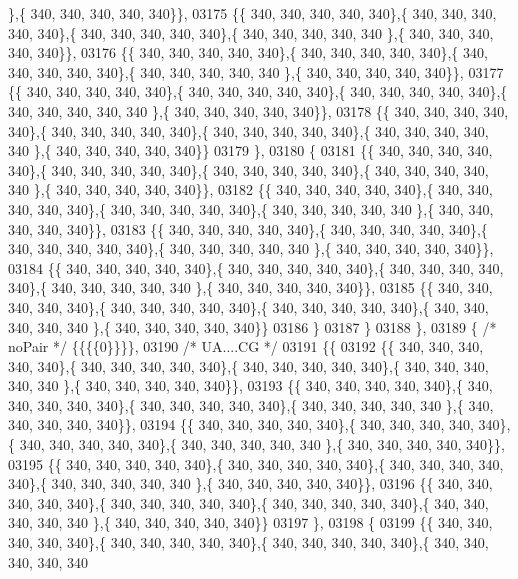 \begin{DoxyCode}
      \},\{ 340, 340, 340, 340, 340\}\},
03175 \{\{ 340, 340, 340, 340, 340\},\{ 340, 340, 340, 340, 340\},\{ 340, 340, 340, 340, 340\},\{ 340, 340, 340, 340, 340
      \},\{ 340, 340, 340, 340, 340\}\},
03176 \{\{ 340, 340, 340, 340, 340\},\{ 340, 340, 340, 340, 340\},\{ 340, 340, 340, 340, 340\},\{ 340, 340, 340, 340, 340
      \},\{ 340, 340, 340, 340, 340\}\},
03177 \{\{ 340, 340, 340, 340, 340\},\{ 340, 340, 340, 340, 340\},\{ 340, 340, 340, 340, 340\},\{ 340, 340, 340, 340, 340
      \},\{ 340, 340, 340, 340, 340\}\},
03178 \{\{ 340, 340, 340, 340, 340\},\{ 340, 340, 340, 340, 340\},\{ 340, 340, 340, 340, 340\},\{ 340, 340, 340, 340, 340
      \},\{ 340, 340, 340, 340, 340\}\}
03179 \},
03180 \{
03181 \{\{ 340, 340, 340, 340, 340\},\{ 340, 340, 340, 340, 340\},\{ 340, 340, 340, 340, 340\},\{ 340, 340, 340, 340, 340
      \},\{ 340, 340, 340, 340, 340\}\},
03182 \{\{ 340, 340, 340, 340, 340\},\{ 340, 340, 340, 340, 340\},\{ 340, 340, 340, 340, 340\},\{ 340, 340, 340, 340, 340
      \},\{ 340, 340, 340, 340, 340\}\},
03183 \{\{ 340, 340, 340, 340, 340\},\{ 340, 340, 340, 340, 340\},\{ 340, 340, 340, 340, 340\},\{ 340, 340, 340, 340, 340
      \},\{ 340, 340, 340, 340, 340\}\},
03184 \{\{ 340, 340, 340, 340, 340\},\{ 340, 340, 340, 340, 340\},\{ 340, 340, 340, 340, 340\},\{ 340, 340, 340, 340, 340
      \},\{ 340, 340, 340, 340, 340\}\},
03185 \{\{ 340, 340, 340, 340, 340\},\{ 340, 340, 340, 340, 340\},\{ 340, 340, 340, 340, 340\},\{ 340, 340, 340, 340, 340
      \},\{ 340, 340, 340, 340, 340\}\}
03186 \}
03187 \}
03188 \},
03189 \{ \textcolor{comment}{/* noPair */} \{\{\{\{0\}\}\}\},
03190 \textcolor{comment}{/* UA....CG */}
03191 \{\{
03192 \{\{ 340, 340, 340, 340, 340\},\{ 340, 340, 340, 340, 340\},\{ 340, 340, 340, 340, 340\},\{ 340, 340, 340, 340, 340
      \},\{ 340, 340, 340, 340, 340\}\},
03193 \{\{ 340, 340, 340, 340, 340\},\{ 340, 340, 340, 340, 340\},\{ 340, 340, 340, 340, 340\},\{ 340, 340, 340, 340, 340
      \},\{ 340, 340, 340, 340, 340\}\},
03194 \{\{ 340, 340, 340, 340, 340\},\{ 340, 340, 340, 340, 340\},\{ 340, 340, 340, 340, 340\},\{ 340, 340, 340, 340, 340
      \},\{ 340, 340, 340, 340, 340\}\},
03195 \{\{ 340, 340, 340, 340, 340\},\{ 340, 340, 340, 340, 340\},\{ 340, 340, 340, 340, 340\},\{ 340, 340, 340, 340, 340
      \},\{ 340, 340, 340, 340, 340\}\},
03196 \{\{ 340, 340, 340, 340, 340\},\{ 340, 340, 340, 340, 340\},\{ 340, 340, 340, 340, 340\},\{ 340, 340, 340, 340, 340
      \},\{ 340, 340, 340, 340, 340\}\}
03197 \},
03198 \{
03199 \{\{ 340, 340, 340, 340, 340\},\{ 340, 340, 340, 340, 340\},\{ 340, 340, 340, 340, 340\},\{ 340, 340, 340, 340, 340

\end{DoxyCode}
